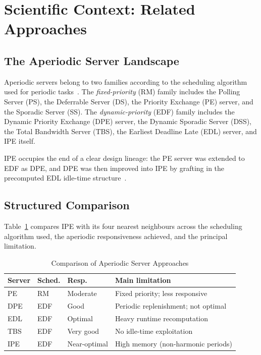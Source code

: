 \documentclass[conference]{IEEEtran}
\begin{document}
\section{Scientific Context: Related Approaches}
\label{sec:context}

\subsection{The Aperiodic Server Landscape}

Aperiodic servers belong to two families according to the
scheduling algorithm used for periodic tasks~\cite{buttazzo2011}.
The \emph{fixed-priority} (RM) family includes the Polling
Server (PS), the Deferrable Server (DS), the Priority Exchange
(PE) server, and the Sporadic Server (SS). The
\emph{dynamic-priority} (EDF) family includes the Dynamic
Priority Exchange (DPE) server, the Dynamic Sporadic Server
(DSS), the Total Bandwidth Server (TBS), the Earliest Deadline
Late (EDL) server, and IPE itself.

IPE occupies the end of a clear design lineage: the PE
server was extended to EDF as DPE, and DPE was then improved
into IPE by grafting in the precomputed EDL idle-time
structure~\cite{spuri1996}.

\subsection{Structured Comparison}

Table~\ref{tab:comparison} compares IPE with its four nearest
neighbours across the scheduling algorithm used, the aperiodic
responsiveness achieved, and the principal limitation.

\begin{table}[t]
\caption{Comparison of Aperiodic Server Approaches}
\label{tab:comparison}
\centering
\renewcommand{\arraystretch}{1.25}
\begin{tabular}{@{}p{1.2cm}p{0.75cm}p{1.35cm}p{2.5cm}@{}}
\toprule
\textbf{Server} & \textbf{Sched.} & \textbf{Resp.} &
  \textbf{Main limitation}\\
\midrule
PE   & RM  & Moderate    & Fixed priority; less responsive\\
DPE  & EDF & Good        & Periodic replenishment; not optimal\\
EDL  & EDF & Optimal     & Heavy runtime recomputation\\
TBS  & EDF & Very good   & No idle-time exploitation\\
IPE  & EDF & Near-optimal& High memory (non-harmonic periods)\\
\bottomrule
\end{tabular}
\end{table}
\end{document}
